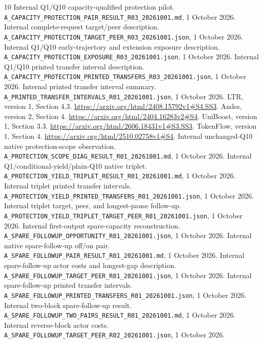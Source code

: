 \documentclass[10pt]{article}
\begin{document}
\begin{thebibliography}{10}
 Internal Q1/Q10 capacity-qualified protection pilot. \nolinkurl{A_CAPACITY_PROTECTION_PAIR_RESULT_R03_20261001.md}, 1 October 2026.
 Internal complete-request target/peer description. \nolinkurl{A_CAPACITY_PROTECTION_TARGET_PEER_R03_20261001.json}, 1 October 2026.
 Internal Q1/Q10 early-trajectory and extension exposure description. \nolinkurl{A_CAPACITY_PROTECTION_EXPOSURE_R03_20261001.json}, 1 October 2026.
 Internal Q1/Q10 printed transfer interval description. \nolinkurl{A_CAPACITY_PROTECTION_PRINTED_TRANSFERS_R03_20261001.json}, 1 October 2026.
 Internal printed transfer interval summary. \nolinkurl{A_PRINTED_TRANSFER_INTERVALS_R01_20261001.json}, 1 October 2026.
 LTR, version 1, Section 4.3. \url{https://arxiv.org/html/2408.15792v1#S4.SS3}.
 Andes, version 2, Section 4. \url{https://arxiv.org/html/2404.16283v2#S4}.
 UniBoost, version 1, Section 3.3. \url{https://arxiv.org/html/2606.18431v1#S3.SS3}.
 TokenFlow, version 1, Section 4. \url{https://arxiv.org/html/2510.02758v1#S4}.
 Internal unchanged-Q10 native protection-scope observation. \nolinkurl{A_PROTECTION_SCOPE_DIAG_RESULT_R01_20261001.md}, 1 October 2026.
 Internal Q1/conditional-yield/plain-Q10 native triplet. \nolinkurl{A_PROTECTION_YIELD_TRIPLET_RESULT_R01_20261001.md}, 1 October 2026.
 Internal triplet printed transfer intervals. \nolinkurl{A_PROTECTION_YIELD_PRINTED_TRANSFERS_R01_20261001.json}, 1 October 2026.
 Internal triplet target, peer, and longest-pause follow-up. \nolinkurl{A_PROTECTION_YIELD_TRIPLET_TARGET_PEER_R01_20261001.json}, 1 October 2026.
 Internal first-output spare-capacity reconstruction. \nolinkurl{A_SPARE_FOLLOWUP_OPPORTUNITY_R01_20261001.json}, 1 October 2026.
 Internal native spare-follow-up off/on pair. \nolinkurl{A_SPARE_FOLLOWUP_PAIR_RESULT_R01_20261001.md}, 1 October 2026.
 Internal spare-follow-up actor costs and longest-gap description. \nolinkurl{A_SPARE_FOLLOWUP_TARGET_PEER_R01_20261001.json}, 1 October 2026.
 Internal spare-follow-up printed transfer intervals. \nolinkurl{A_SPARE_FOLLOWUP_PRINTED_TRANSFERS_R01_20261001.json}, 1 October 2026.
 Internal two-block spare-follow-up result. \nolinkurl{A_SPARE_FOLLOWUP_TWO_PAIRS_RESULT_R01_20261001.md}, 1 October 2026.
 Internal reverse-block actor costs. \nolinkurl{A_SPARE_FOLLOWUP_TARGET_PEER_R02_20261001.json}, 1 October 2026.

\end{thebibliography}
\end{document}
